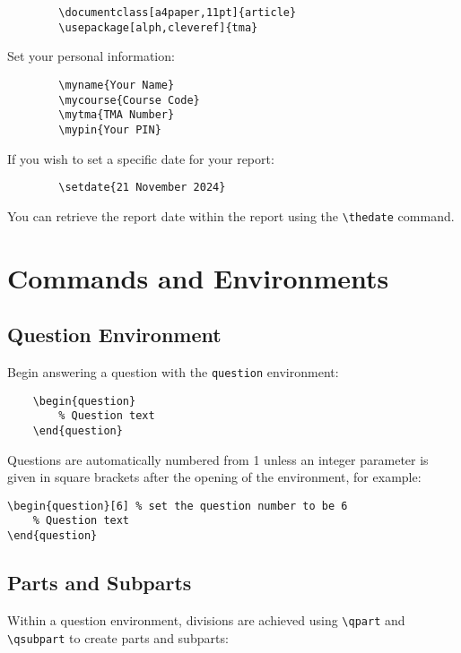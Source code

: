 \documentclass[a4paper,11pt,twoside]{article}
\begin{document}
	\begin{verbatim}
		\documentclass[a4paper,11pt]{article}
		\usepackage[alph,cleveref]{tma}
	\end{verbatim}

	Set your personal information:

	\begin{verbatim}
		\myname{Your Name}
		\mycourse{Course Code}
		\mytma{TMA Number}
		\mypin{Your PIN}
	\end{verbatim}

	If you wish to set a specific date for your report:

	\begin{verbatim}
		\setdate{21 November 2024}
	\end{verbatim}

	You can retrieve the report date within the report using the \verb|\thedate| command.

	\section{Commands and Environments}

	\subsection{Question Environment}

	Begin answering a question with the \texttt{question} environment:

	\begin{verbatim}
	\begin{question}
		% Question text
	\end{question}
\end{verbatim}

Questions are automatically numbered from 1 unless an integer parameter is given in square brackets after the opening of the environment, for example:

\begin{verbatim}
\begin{question}[6] % set the question number to be 6
	% Question text
\end{question}
\end{verbatim}

\subsection{Parts and Subparts}

Within a question environment, divisions are achieved using \verb|\qpart| and \verb|\qsubpart| to create parts and subparts:
\end{document}
